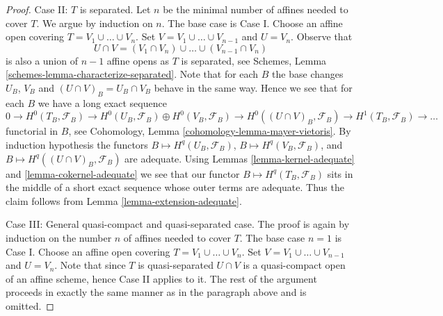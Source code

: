 \documentclass{stacks-project}
\theoremstyle{plain}
\theoremstyle{definition}
\theoremstyle{remark}
\numberwithin{equation}{subsection}
\begin{document}
\begin{proof}
\medskip\noindent
Case II: $T$ is separated. Let $n$ be the minimal number of affines needed
to cover $T$. We argue by induction on $n$. The base case is Case I.
Choose an affine open covering $T = V_1 \cup \ldots \cup V_n$.
Set $V = V_1 \cup \ldots \cup V_{n - 1}$ and $U = V_n$. Observe that
$$
U \cap V = (V_1 \cap V_n) \cup \ldots \cup (V_{n - 1} \cap V_n)
$$
is also a union of $n - 1$ affine opens as $T$ is separated, see
Schemes, Lemma \ref{schemes-lemma-characterize-separated}.
Note that for each $B$ the base changes $U_B$, $V_B$ and
$(U \cap V)_B = U_B \cap V_B$ behave in the same way. Hence we see that
for each $B$ we have a long exact sequence
$$
0 \to
H^0(T_B, \mathcal{F}_B) \to
H^0(U_B, \mathcal{F}_B) \oplus H^0(V_B, \mathcal{F}_B) \to
H^0((U \cap V)_B, \mathcal{F}_B) \to
H^1(T_B, \mathcal{F}_B) \to \ldots
$$
functorial in $B$, see
Cohomology, Lemma \ref{cohomology-lemma-mayer-vietoris}.
By induction hypothesis the functors
$B \mapsto H^q(U_B, \mathcal{F}_B)$,
$B \mapsto H^q(V_B, \mathcal{F}_B)$, and
$B \mapsto H^q((U \cap V)_B, \mathcal{F}_B)$
are adequate. Using
Lemmas \ref{lemma-kernel-adequate} and
\ref{lemma-cokernel-adequate}
we see that our functor $B \mapsto H^q(T_B, \mathcal{F}_B)$ sits in the
middle of a short exact sequence whose outer terms are adequate.
Thus the claim follows from
Lemma \ref{lemma-extension-adequate}.

\medskip\noindent
Case III: General quasi-compact and quasi-separated case.
The proof is again by induction on the number $n$ of affines needed to
cover $T$. The base case $n = 1$ is Case I.
Choose an affine open covering $T = V_1 \cup \ldots \cup V_n$.
Set $V = V_1 \cup \ldots \cup V_{n - 1}$ and $U = V_n$. Note that
since $T$ is quasi-separated $U \cap V$ is a quasi-compact open of an
affine scheme, hence Case II applies to it. The rest of the argument
proceeds in exactly the same manner as in the paragraph above and is
omitted.
\end{proof}
\end{document}
